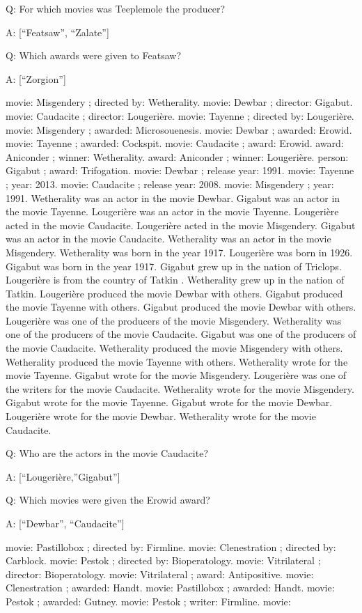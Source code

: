 \documentclass[
]{article}
\begin{document}
Q: For which movies was Teeplemole the producer?

A: {[}``Featsaw'', ``Zalate''{]}

Q: Which awards were given to Featsaw?

A: {[}``Zorgion''{]}

movie: Misgendery ; directed by: Wetherality. movie: Dewbar ; director:
Gigabut. movie: Caudacite ; director: Lougerière. movie: Tayenne ;
directed by: Lougerière. movie: Misgendery ; awarded: Microsouenesis.
movie: Dewbar ; awarded: Erowid. movie: Tayenne ; awarded: Cockspit.
movie: Caudacite ; award: Erowid. award: Aniconder ; winner:
Wetherality. award: Aniconder ; winner: Lougerière. person: Gigabut ;
award: Trifogation. movie: Dewbar ; release year: 1991. movie: Tayenne ;
year: 2013. movie: Caudacite ; release year: 2008. movie: Misgendery ;
year: 1991. Wetherality was an actor in the movie Dewbar. Gigabut was an
actor in the movie Tayenne. Lougerière was an actor in the movie
Tayenne. Lougerière acted in the movie Caudacite. Lougerière acted in
the movie Misgendery. Gigabut was an actor in the movie Caudacite.
Wetherality was an actor in the movie Misgendery. Wetherality was born
in the year 1917. Lougerière was born in 1926. Gigabut was born in the
year 1917. Gigabut grew up in the nation of Triclops. Lougerière is from
the country of Tatkin . Wetherality grew up in the nation of Tatkin.
Lougerière produced the movie Dewbar with others. Gigabut produced the
movie Tayenne with others. Gigabut produced the movie Dewbar with
others. Lougerière was one of the producers of the movie Misgendery.
Wetherality was one of the producers of the movie Caudacite. Gigabut was
one of the producers of the movie Caudacite. Wetherality produced the
movie Misgendery with others. Wetherality produced the movie Tayenne
with others. Wetherality wrote for the movie Tayenne. Gigabut wrote for
the movie Misgendery. Lougerière was one of the writers for the movie
Caudacite. Wetherality wrote for the movie Misgendery. Gigabut wrote for
the movie Tayenne. Gigabut wrote for the movie Dewbar. Lougerière wrote
for the movie Dewbar. Wetherality wrote for the movie Caudacite.

Q: Who are the actors in the movie Caudacite?

A: {[}``Lougerière,''Gigabut''{]}

Q: Which movies were given the Erowid award?

A: {[}``Dewbar'', ``Caudacite''{]}

movie: Pastillobox ; directed by: Firmline. movie: Clenestration ;
directed by: Carblock. movie: Pestok ; directed by: Bioperatology.
movie: Vitrilateral ; director: Bioperatology. movie: Vitrilateral ;
award: Antipositive. movie: Clenestration ; awarded: Handt. movie:
Pastillobox ; awarded: Handt. movie: Pestok ; awarded: Gutney. movie:
Pestok ; writer: Firmline. movie:
\end{document}
